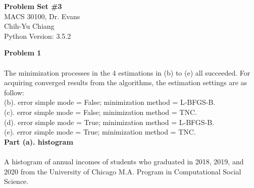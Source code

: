 \documentclass[letterpaper,12pt]{article}
\theoremstyle{definition}
\begin{document}
\begin{flushleft}
  \textbf{\large{Problem Set \#3}} \\
  MACS 30100, Dr. Evans \\
  Chih-Yu Chiang \\
  Python Version: 3.5.2
\end{flushleft}
\vspace{5mm}
\noindent\textbf{Problem 1} \\
\\
The minimization processes in the 4 estimations in (b) to (e) all succeeded.
For acquiring converged results from the algorithms, the estimation settings are as follow: \\
(b). error simple mode = False; minimization method = L-BFGS-B. \\
(c). error simple mode = False; minimization method = TNC. \\
(d). error simple mode = True; minimization method = L-BFGS-B. \\
(e). error simple mode = True; minimization method = TNC. \\

\noindent\textbf{Part (a). histogram} \\
\\
A histogram of annual incomes of students who graduated in 2018, 2019, and 2020 from the University of Chicago M.A. Program in Computational Social Science. \\
\\
\begin{figure}[htb]\centering\captionsetup{width=6.0in}
  \caption{\textbf{}}
\end{figure} \\
\end{document}
